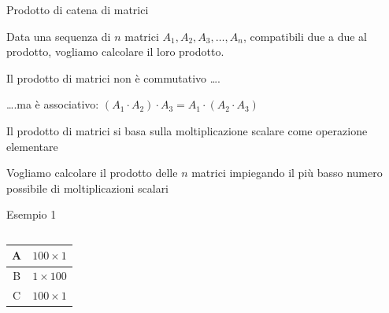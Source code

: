 \begin{frame}{Prodotto di catena di matrici}

\vspace{-6pt}
\begin{myboxtitle}[Problema]
Data una sequenza di $n$ matrici $A_1, A_2, A_3, \ldots, A_n$, compatibili due a due al prodotto, vogliamo calcolare il loro prodotto.
\BIL
\item  Il prodotto di matrici non è \alert{commutativo} \ldots .
\item  \ldots .ma è \alert{associativo}: $(A_1 \cdot A_2) \cdot A_3 = A_1 \cdot (A_2 \cdot A_3)$ 
\EIL
\end{myboxtitle}

\begin{myboxtitle}
\BIL
\item Il prodotto di matrici si basa sulla \alert{moltiplicazione scalare} come operazione elementare
\item Vogliamo calcolare il prodotto delle $n$ matrici impiegando il più basso numero possibile di moltiplicazioni scalari
\EIL
\end{myboxtitle}

\end{frame}

\begin{frame}{Esempio 1}
    
\vspace{-6pt}
\begin{columns}[T]
\begingroup
\setlength\arrayrulewidth{1pt}
\begin{tabular}{|c|c|}
\hline
A & $100 \times 1$ \\\hline
B & $1 \times 100$ \\\hline
C & $100 \times 1$ \\\hline
\end{tabular}    
\endgroup
{}
\vspace{-16pt}    
\end{columns}

\end{frame}

